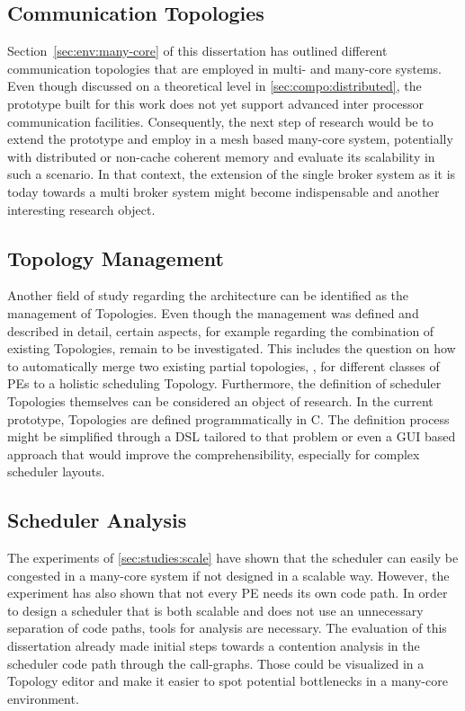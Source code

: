 \subsection{Communication Topologies}

Section~\ref{sec:env:many-core} of this dissertation has outlined different communication topologies that are employed in multi- and many-core systems. Even though discussed on a theoretical level in \cref{sec:compo:distributed}, the prototype built for this work does not yet support advanced inter processor communication facilities. Consequently, the next step of research would be to extend the prototype and employ \cobas{} in a mesh based many-core system, potentially with distributed or non-cache coherent memory and evaluate its scalability in such a scenario. In that context, the extension of the single broker system as it is today towards a multi broker system might become indispensable and another interesting research object.

\subsection{Topology Management}

Another field of study regarding the \cobas{} architecture can be identified as the management of Topologies. Even though the management was defined and described in detail, certain aspects, for example regarding the combination of existing Topologies, remain to be investigated. This includes the question on how to automatically merge two existing partial topologies, \eg{}, for different classes of \acp{PE} to a holistic scheduling Topology. Furthermore, the definition of scheduler Topologies themselves can be considered an object of research. In the current prototype, Topologies are defined programmatically in C. The definition process might be simplified through a \ac{DSL} tailored to that problem or even a \ac{GUI} based approach that would improve the comprehensibility, especially for complex scheduler layouts.

\subsection{Scheduler Analysis}

The experiments of \cref{sec:studies:scale} have shown that the scheduler can easily be congested in a many-core system if not designed in a scalable way. However, the experiment has also shown that not every \ac{PE} needs its own code path. In order to design a scheduler that is both scalable and does not use an unnecessary separation of code paths, tools for analysis are necessary. The evaluation of this dissertation already made initial steps towards a contention analysis in the scheduler code path through the call-graphs. Those could be visualized in a Topology editor and make it easier to spot potential bottlenecks in a many-core environment.


